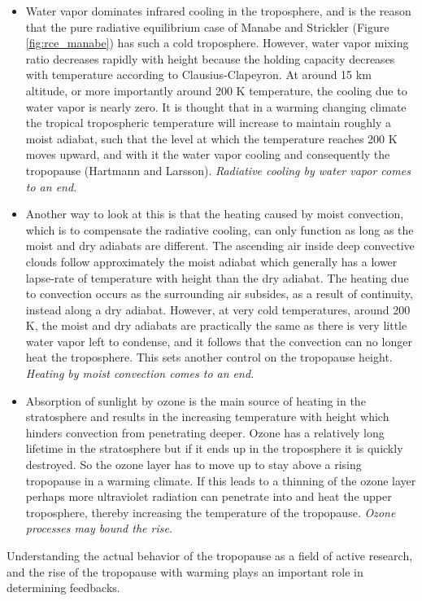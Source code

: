 \documentclass[12pt]{book}
\begin{document}
\begin{itemize}
\item
Water vapor dominates infrared cooling in the troposphere, and is the reason that the pure radiative equilibrium case of Manabe and Strickler (Figure \ref{fig:rce_manabe}) has such a cold troposphere. However, water vapor mixing ratio decreases rapidly with height because the holding capacity decreases with temperature according to Clausius-Clapeyron. At around 15 km altitude, or more importantly around 200 K temperature, the cooling due to water vapor is nearly zero. It is thought that in a warming changing climate the tropical tropospheric temperature will increase to maintain roughly a moist adiabat, such that the level at which the temperature reaches 200 K moves upward, and with it the water vapor cooling and consequently the tropopause (Hartmann and Larsson\cite{Hartmann2002}). {\em Radiative cooling by water vapor comes to an end.}
\item
Another way to look at this is that the heating caused by moist convection, which is to compensate the radiative cooling, can only function as long as the moist and dry adiabats are different. The ascending air inside deep convective clouds follow approximately the moist adiabat which generally has a lower lapse-rate of temperature with height than the dry adiabat. The heating due to convection occurs as the surrounding air subsides, as a result of continuity, instead along a dry adiabat. However, at very cold temperatures, around 200 K, the moist and dry adiabats are practically the same as there is very little water vapor left to condense, and it follows that the convection can no longer heat the troposphere. This sets another control on the tropopause height. {\em Heating by moist convection comes to an end.}
\item
Absorption of sunlight by ozone is the main source of heating in the stratosphere and results in the increasing temperature with height which hinders convection from penetrating deeper. Ozone has a relatively long lifetime in the stratosphere but if it ends up in the troposphere it is quickly destroyed. So the ozone layer has to move up to stay above a rising tropopause in a warming climate. If this leads to a thinning of the ozone layer perhaps more ultraviolet radiation can penetrate into and heat the upper troposphere, thereby increasing the temperature of the tropopause. {\em Ozone processes may bound the rise.}
\end{itemize}
Understanding the actual behavior of the tropopause as a field of active research, and the rise of the tropopause with warming plays an important role in determining feedbacks. 
\end{document}
